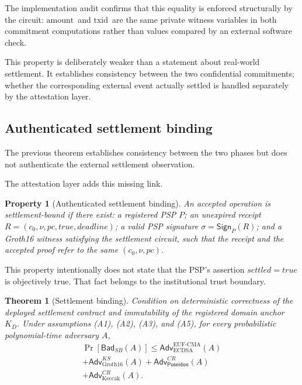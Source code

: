 \documentclass[10pt,twocolumn]{article}
\newtheorem{property}{Property}
\newtheorem{theorem}{Theorem}
\newcommand{\Poseidon}{\ensuremath{\mathsf{Poseidon}}}
\newcommand{\amount}{\ensuremath{\text{amount}}}
\newcommand{\txid}{\ensuremath{\text{txid}}}
\newcommand{\pc}{\ensuremath{\mathit{pc}}}
\begin{document}
The implementation audit confirms that this equality is enforced
structurally by the circuit: \amount\ and \txid\ are the same private
witness variables in both commitment computations rather than values
compared by an external software check.

This property is deliberately weaker than a statement about real-world
settlement. It establishes consistency between the two confidential
commitments; whether the corresponding external event actually settled
is handled separately by the attestation layer.

\subsection{Authenticated settlement binding}

The previous theorem establishes consistency between the two phases but
does not authenticate the external settlement observation.

The attestation layer adds this missing link.

\begin{property}[Authenticated settlement binding]
An accepted operation is settlement-bound if there exist: a registered
PSP $P$; an unexpired receipt
$R=(c_0,\nu,\pc,\mathit{true},\mathit{deadline})$; a valid PSP signature
$\sigma=\mathsf{Sign}_P(R)$; and a Groth16 witness satisfying the
settlement circuit, such that the receipt and the accepted proof refer to
the same $(c_0,\nu,\pc)$.
\end{property}

This property intentionally does not state that the PSP's assertion
$\mathit{settled}=\mathit{true}$ is objectively true. That fact belongs
to the institutional trust boundary.

\begin{theorem}[Settlement binding]
\label{thm:settlement-binding}
Condition on deterministic correctness of the deployed settlement
contract and immutability of the registered domain anchor $K_D$. Under
assumptions (A1), (A2), (A3), and (A5), for every probabilistic
polynomial-time adversary $A$,
\begin{multline}
\Pr[\mathsf{Bad}_{SB}(A)] \le \mathsf{Adv}^{\mathrm{EUF\text{-}CMA}}_{\mathrm{ECDSA}}(A) \\
+ \mathsf{Adv}^{KS}_{\mathrm{Groth16}}(A) + \mathsf{Adv}^{CR}_{\Poseidon}(A) \\
+ \mathsf{Adv}^{CR}_{\mathrm{Keccak}}(A). \label{eq:badsb}
\end{multline}
\end{theorem}
\end{document}
